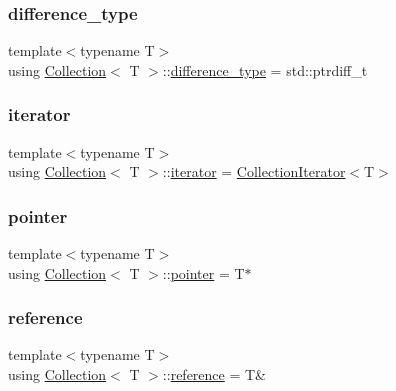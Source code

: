 \mbox{\label{class_collection_a60b36ef7aba0a88dff0e98fc2adb98a8}} 
\subsubsection{\texorpdfstring{difference\+\_\+type}{difference\_type}}
{\footnotesize\ttfamily template$<$typename T$>$ \\
using \hyperlink{class_collection}{Collection}$<$ T $>$\+::\hyperlink{class_collection_a60b36ef7aba0a88dff0e98fc2adb98a8}{difference\+\_\+type} =  std\+::ptrdiff\+\_\+t}

\mbox{\label{class_collection_a317dca4fdf1eb2e47643bb60c620f802}} 
\subsubsection{\texorpdfstring{iterator}{iterator}}
{\footnotesize\ttfamily template$<$typename T$>$ \\
using \hyperlink{class_collection}{Collection}$<$ T $>$\+::\hyperlink{class_collection_a317dca4fdf1eb2e47643bb60c620f802}{iterator} =  \hyperlink{class_collection_iterator}{Collection\+Iterator}$<$T$>$}

\mbox{\label{class_collection_a9a5b5d9b389c113364d527900c745efb}} 
\subsubsection{\texorpdfstring{pointer}{pointer}}
{\footnotesize\ttfamily template$<$typename T$>$ \\
using \hyperlink{class_collection}{Collection}$<$ T $>$\+::\hyperlink{class_collection_a9a5b5d9b389c113364d527900c745efb}{pointer} =  T$\ast$}

\mbox{\label{class_collection_abbc291771b11c48cd2f297a0d9fe0449}} 
\subsubsection{\texorpdfstring{reference}{reference}}
{\footnotesize\ttfamily template$<$typename T$>$ \\
using \hyperlink{class_collection}{Collection}$<$ T $>$\+::\hyperlink{class_collection_abbc291771b11c48cd2f297a0d9fe0449}{reference} =  T\&}

